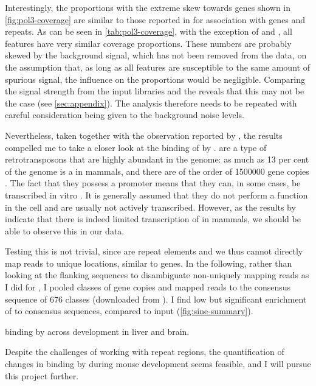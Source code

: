 Interestingly, the proportions with the extreme skew towards \trna genes shown
in \cref{fig:pol3-coverage} are similar to those reported in
\citet{Raha:2010,Canella:2012} for  association with  genes and
repeats. As can be seen in \cref{tab:pol3-coverage}, with the exception of \rrna
and , all features have very similar coverage proportions. These
numbers are probably skewed by the  \chipseq background signal, which has
not been removed from the data, on the assumption that, as long as all features
are susceptible to the same amount of spurious signal, the influence on the
proportions would be negligible. Comparing the signal strength from the input
libraries and the  \chip reveals that this may not be the case (see
\cref{sec:appendix}). The analysis therefore needs to be repeated with careful
consideration being given to the background noise levels.

Nevertheless, taken together with the observation reported by
\citet{Carriere:2012}, the results compelled me to take a closer look at the
binding of \transsine by . \transsine are a type of retrotransposons that
are highly abundant in the genome: as much as \num{13} per cent of the genome is
a \transsine in mammals, and there are of the order of \num{1500000} gene copies
\citep{Lander:2001}. The fact that they possess a  promoter means that they
can, in some cases, be transcribed in vitro \citep{White:1998}. It is generally
assumed that they do not perform a function in the cell and are usually not
actively transcribed. However, as the results by \citet{Carriere:2012} indicate
that there is indeed limited transcription of \transsine in mammals, we should
be able to observe this in our  \chip data.

Testing this is not trivial, since \transsine[s] are repeat elements and we thus
cannot directly map reads to unique locations, similar to \trna genes. In the
following, rather than looking at the flanking sequences to disambiguate
non-uniquely mapping reads as I did for \trna, I pooled classes of \transsine
gene copies and mapped  \chipseq reads to the consensus sequence of
\num{676} classes (downloaded from  \citep{Jurka:2005}). I find
low but significant enrichment of  to \transsine consensus sequences,
compared to input (\cref{fig:sine-summary}).

{ binding by  across development in liver and brain.}{}

Despite the challenges of working with repeat regions, the quantification of
changes in \transsine binding by  during mouse development seems feasible,
and I will pursue this project further.

